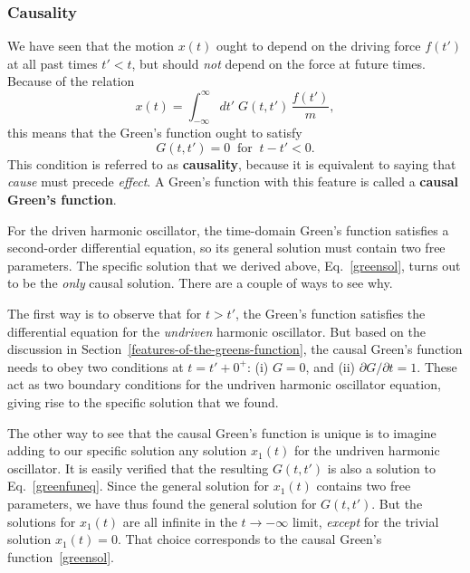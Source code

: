 \documentclass[10pt,a4paper]{article}
\begin{document}
\subsubsection{Causality}
\label{causality}

We have seen that the motion $x(t)$ ought to depend on the driving
force $f(t')$ at all past times $t' < t$, but should \emph{not} depend
on the force at future times. Because of the relation
\begin{equation}
x(t) = \int_{-\infty}^\infty dt'\; G(t,t')\, \frac{f(t')}{m},
\end{equation}
this means that the Green's function ought to satisfy
\begin{equation}
G(t,t') = 0 \;\; \mathrm{for}\;\; t -t' < 0.
\end{equation}
This condition is referred to as \textbf{causality}, because it is
equivalent to saying that \emph{cause} must precede \emph{effect}. A
Green's function with this feature is called a \textbf{causal Green's
  function}.

For the driven harmonic oscillator, the time-domain Green's function
satisfies a second-order differential equation, so its general
solution must contain two free parameters. The specific solution that
we derived above, Eq.~\eqref{greensol}, turns out to be the
\emph{only} causal solution. There are a couple of ways to see why.

The first way is to observe that for $t > t'$, the Green's function
satisfies the differential equation for the \emph{undriven} harmonic
oscillator.  But based on the discussion in
Section~\ref{features-of-the-greens-function}, the causal Green's
function needs to obey two conditions at $t = t' + 0^+$: (i) $G = 0$,
and (ii) $\partial G / \partial t = 1$. These act as two boundary
conditions for the undriven harmonic oscillator equation, giving rise
to the specific solution that we found.

The other way to see that the causal Green's function is unique is to
imagine adding to our specific solution any solution $x_1(t)$ for the
undriven harmonic oscillator. It is easily verified that the resulting
$G(t,t')$ is also a solution to Eq.~\eqref{greenfuneq}.  Since the
general solution for $x_1(t)$ contains two free parameters, we have
thus found the general solution for $G(t,t')$. But the solutions for
$x_1(t)$ are all infinite in the $t \rightarrow -\infty$ limit,
\emph{except} for the trivial solution $x_1(t) = 0$.  That choice
corresponds to the causal Green's function~\eqref{greensol}.
\end{document}

